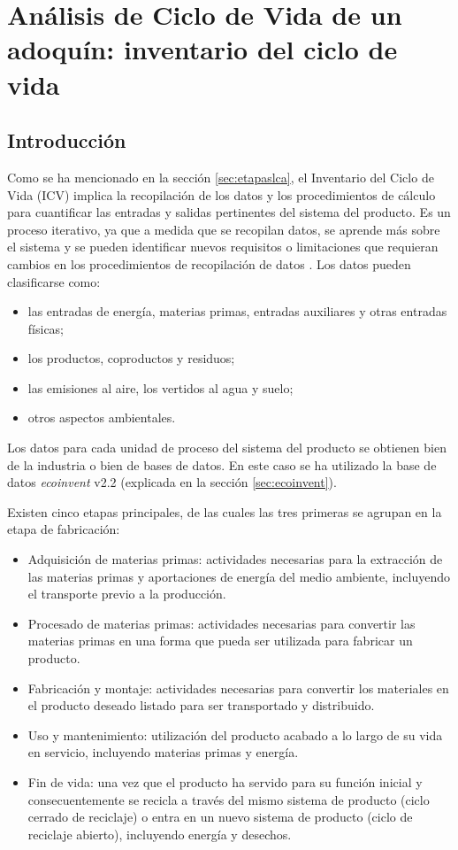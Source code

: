 \chapter{Análisis de Ciclo de Vida de un adoquín: inventario del ciclo de vida}\label{cap:acv_inventario}

\section{Introducción}\label{sec:intro_icv}
Como se ha mencionado en la sección \ref{sec:etapaslca}, el Inventario del Ciclo de Vida (ICV) implica la recopilación de los datos y los procedimientos de cálculo para cuantificar las entradas y salidas pertinentes del sistema del producto. Es un proceso iterativo, ya que a medida que se recopilan datos, se aprende más sobre el sistema y se pueden identificar nuevos requisitos o limitaciones que requieran cambios en los procedimientos de recopilación de datos \cite{iso14040}. Los datos pueden clasificarse como:
\begin{itemize}
  \item las entradas de energía, materias primas, entradas auxiliares y otras entradas físicas;
  \item los productos, coproductos y residuos;
  \item las emisiones al aire, los vertidos al agua y suelo;
  \item otros aspectos ambientales.
\end{itemize}

Los datos para cada unidad de proceso del sistema del producto se obtienen bien de la industria o bien de bases de datos. En este caso se ha utilizado la base de datos \textit{ecoinvent} v2.2 (explicada en la sección \ref{sec:ecoinvent}).

Existen cinco etapas principales, de las cuales las tres primeras se agrupan en la etapa de fabricación:
\begin{itemize}
  \item Adquisición de materias primas: actividades necesarias para la extracción de las materias primas y aportaciones de energía del medio ambiente, incluyendo el transporte previo a la producción.
  \item Procesado de materias primas: actividades necesarias para convertir las materias primas en una forma que pueda ser utilizada para fabricar un producto.
  \item Fabricación y montaje: actividades necesarias para convertir los materiales en el producto deseado listado para ser transportado y distribuido.
  \item Uso y mantenimiento: utilización del producto acabado a lo largo de su vida en servicio, incluyendo materias primas y energía.
  \item Fin de vida: una vez que el producto ha servido para su función inicial y consecuentemente se recicla a través del mismo sistema de producto (ciclo cerrado de reciclaje) o entra en un nuevo sistema de producto (ciclo de reciclaje abierto), incluyendo energía y desechos.
\end{itemize}

